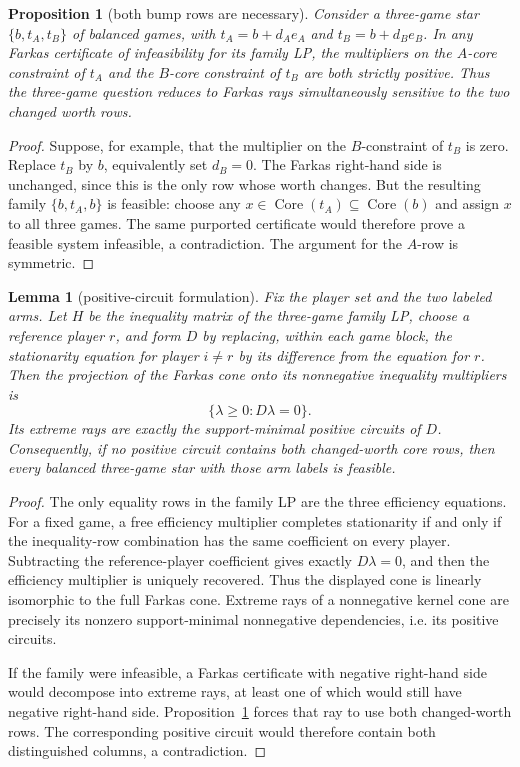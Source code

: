 \documentclass[11pt]{article}
\newtheorem{lemma}[theorem]{Lemma}
\newtheorem{proposition}[theorem]{Proposition}
\newcommand{\core}{\operatorname{Core}}
\begin{document}
\begin{proposition}[both bump rows are necessary]
\label{prop:both-sensitive}
Consider a three-game star $\{b,t_A,t_B\}$ of balanced games, with
$t_A=b+d_Ae_A$ and $t_B=b+d_Be_B$.  In any Farkas certificate of
infeasibility for its family LP, the multipliers on the $A$-core constraint
of $t_A$ and the $B$-core constraint of $t_B$ are both strictly positive.
Thus the three-game question reduces to Farkas rays simultaneously sensitive
to the two changed worth rows.
\end{proposition}

\begin{proof}
Suppose, for example, that the multiplier on the $B$-constraint of $t_B$ is
zero.  Replace $t_B$ by $b$, equivalently set $d_B=0$.  The Farkas
right-hand side is unchanged, since this is the only row whose worth changes.
But the resulting family $\{b,t_A,b\}$ is feasible: choose any
$x\in\core(t_A)\subseteq\core(b)$ and assign $x$ to all three games.
The same purported certificate would therefore prove a feasible system
infeasible, a contradiction.  The argument for the $A$-row is symmetric.
\end{proof}

\begin{lemma}[positive-circuit formulation]
\label{lem:family-circuits}
Fix the player set and the two labeled arms.  Let $H$ be the inequality
matrix of the three-game family LP, choose a reference player $r$, and form
$D$ by replacing, within each game block, the stationarity equation for
player $i\neq r$ by its difference from the equation for $r$.  Then the
projection of the Farkas cone onto its nonnegative inequality multipliers is
\[
 \{\lambda\geq0:D\lambda=0\}.
\]
Its extreme rays are exactly the support-minimal positive circuits of $D$.
Consequently, if no positive circuit contains both changed-worth core rows,
then every balanced three-game star with those arm labels is feasible.
\end{lemma}

\begin{proof}
The only equality rows in the family LP are the three efficiency equations.
For a fixed game, a free efficiency multiplier completes stationarity if and
only if the inequality-row combination has the same coefficient on every
player.  Subtracting the reference-player coefficient gives exactly
$D\lambda=0$, and then the efficiency multiplier is uniquely recovered.
Thus the displayed cone is linearly isomorphic to the full Farkas cone.
Extreme rays of a nonnegative kernel cone are precisely its nonzero
support-minimal nonnegative dependencies, i.e. its positive circuits.

If the family were infeasible, a Farkas certificate with negative right-hand
side would decompose into extreme rays, at least one of which would still have
negative right-hand side.  Proposition~\ref{prop:both-sensitive} forces that
ray to use both changed-worth rows.  The corresponding positive circuit would
therefore contain both distinguished columns, a contradiction.
\end{proof}
\end{document}
